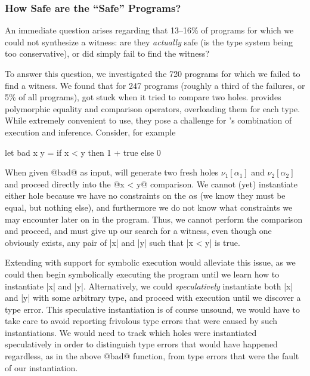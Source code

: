 \subsubsection{How Safe are the ``Safe'' Programs?}
\label{sec:how-safe}

An immediate question arises regarding that 13--16\% of programs for
which we could not synthesize a witness:
%
are they \emph{actually} safe (\ie is the type system being too conservative),
%
or did \toolname simply fail to find the witness?


To answer this question, we investigated the 720 \ucsdbench programs for
which we failed to find a witness.
%
We found that for 247 programs (roughly a third of the failures, or 5\%
of all programs), \toolname got stuck when it tried to compare two holes.
%
\ocaml provides polymorphic equality and comparison operators,
overloading them for each type.
%
While extremely convenient to use, they pose a challenge for \toolname's
combination of execution and inference.
%
Consider, for example
%
\begin{code}
  let bad x y =
    if x < y then
      1 + true
    else
      0
\end{code}
%
When given @bad@ as input, \toolname will generate two fresh holes
$\nu_1[\alpha_1]$ and $\nu_2[\alpha_2]$ and proceed directly into the
@x < y@ comparison.
%
We cannot (yet) instantiate either hole because we have no constraints
on the $\alpha$s (we know they must be equal, but nothing else), and
furthermore we do not know what constraints we may encounter later on in
the program.
%
Thus, we cannot perform the comparison and proceed, and must give up our
search for a witness, even though one obviously exists, any pair of |x|
and |y| such that |x < y| is true.

Extending \toolname with support for symbolic execution would alleviate
this issue, as we could then begin symbolically executing the program
until we learn how to instantiate |x| and |y|.
%
Alternatively, we could \emph{speculatively} instantiate both |x| and
|y| with some arbitrary type, and proceed with execution until we
discover a type error.
%
This speculative instantiation is of course unsound, we would have to
take care to avoid reporting frivolous type errors that were caused by
such instantiations.
%
We would need to track which holes were instantiated speculatively in
order to distinguish type errors that would have happened regardless, as
in the above @bad@ function, from type errors that were the fault of our
instantiation.

